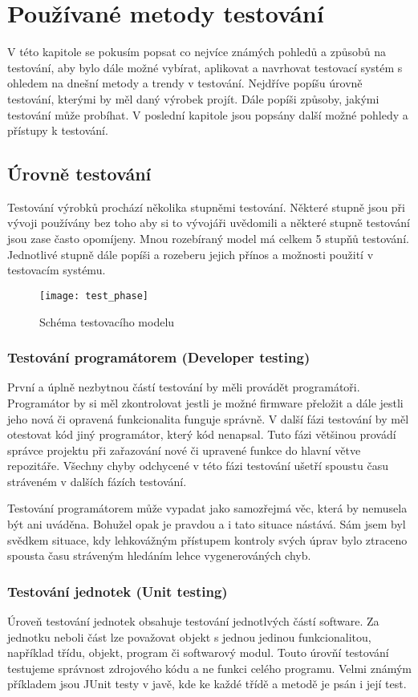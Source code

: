 \chapter{Používané metody testování}
V této kapitole se pokusím popsat co nejvíce známých pohledů a způsobů na testování, aby bylo dále možné vybírat, aplikovat a navrhovat testovací systém s ohledem na dnešní metody a trendy v testování. Nejdříve popíšu úrovně testování, kterými by měl daný výrobek projít. Dále popíši způsoby, jakými testování může probíhat. V poslední kapitole jsou popsány další možné pohledy a přístupy k testování.

\section{Úrovně testování}
Testování výrobků prochází několika stupněmi testování. Některé stupně jsou při vývoji používány bez toho aby si to vývojáři uvědomili a některé stupně testování jsou zase často opomíjeny. Mnou rozebíraný model má celkem 5 stupňů testování. Jednotlivé stupně dále popíši a rozeberu jejich přínos a možnosti použití v testovacím systému.

\begin{figure}[h]
  \centering
  \texttt{[image: test\_phase]}
  \caption{Schéma testovacího modelu}
  \label{fig:test_phase}
\end{figure}

\subsection{Testování programátorem (Developer testing)}
První a úplně nezbytnou částí testování by měli provádět programátoři. Programátor by si měl zkontrolovat jestli je možné firmware přeložit a dále jestli jeho nová či opravená funkcionalita funguje správně. V další fázi testování by měl otestovat kód jiný programátor, který kód nenapsal. Tuto fázi většinou provádí správce projektu při zařazování nové či upravené funkce do hlavní větve repozitáře. Všechny chyby odchycené v této fázi testování ušetří spoustu času stráveném v dalších fázích testování.

Testování programátorem může vypadat jako samozřejmá věc, která by nemusela být ani uváděna. Bohužel opak je pravdou a i tato situace nástává. Sám jsem byl svědkem situace, kdy lehkovážným přístupem kontroly svých úprav bylo ztraceno spousta času stráveným hledáním lehce vygenerováných chyb.

\subsection{Testování jednotek (Unit testing)}
Úroveň testování jednotek obsahuje testování jednotlvých částí software. Za jednotku neboli část lze považovat objekt s jednou jedinou funkcionalitou, například třídu, objekt, program či softwarový modul. Touto úrovňí testování testujeme správnost zdrojového kódu a ne funkci celého programu. Velmi známým příkladem jsou JUnit testy v javě, kde ke každé třídě a metodě je psán i její test.

